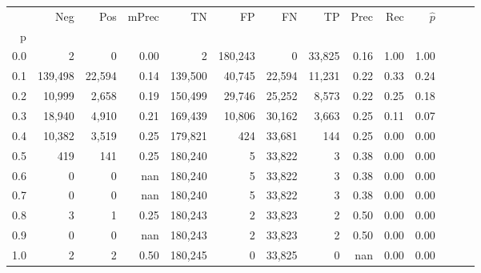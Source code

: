\begin{tabular}{rrrrrrrrrrrrrr}
\toprule
{} &      Neg &     Pos & mPrec &       TN &       FP &      FN &      TP &  Prec &   Rec & $\hat{p}$ \\
p   &          &         &       &          &          &         &         &       &       &           \\
\midrule
0.0 &        2 &       0 &  0.00 &        2 &  180,243 &       0 &  33,825 &  0.16 &  1.00 &      1.00 \\
0.1 &  139,498 &  22,594 &  0.14 &  139,500 &   40,745 &  22,594 &  11,231 &  0.22 &  0.33 &      0.24 \\
0.2 &   10,999 &   2,658 &  0.19 &  150,499 &   29,746 &  25,252 &   8,573 &  0.22 &  0.25 &      0.18 \\
0.3 &   18,940 &   4,910 &  0.21 &  169,439 &   10,806 &  30,162 &   3,663 &  0.25 &  0.11 &      0.07 \\
0.4 &   10,382 &   3,519 &  0.25 &  179,821 &      424 &  33,681 &     144 &  0.25 &  0.00 &      0.00 \\
0.5 &      419 &     141 &  0.25 &  180,240 &        5 &  33,822 &       3 &  0.38 &  0.00 &      0.00 \\
0.6 &        0 &       0 &   nan &  180,240 &        5 &  33,822 &       3 &  0.38 &  0.00 &      0.00 \\
0.7 &        0 &       0 &   nan &  180,240 &        5 &  33,822 &       3 &  0.38 &  0.00 &      0.00 \\
0.8 &        3 &       1 &  0.25 &  180,243 &        2 &  33,823 &       2 &  0.50 &  0.00 &      0.00 \\
0.9 &        0 &       0 &   nan &  180,243 &        2 &  33,823 &       2 &  0.50 &  0.00 &      0.00 \\
1.0 &        2 &       2 &  0.50 &  180,245 &        0 &  33,825 &       0 &   nan &  0.00 &      0.00 \\
\bottomrule
\end{tabular}
